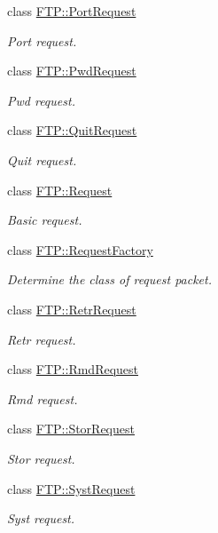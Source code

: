 \begin{DoxyCompactItemize}
class \hyperlink{classFTP_1_1PortRequest}{F\-T\-P\-::\-Port\-Request}
\begin{DoxyCompactList}\small\item\em Port request. \end{DoxyCompactList}\item 
class \hyperlink{classFTP_1_1PwdRequest}{F\-T\-P\-::\-Pwd\-Request}
\begin{DoxyCompactList}\small\item\em Pwd request. \end{DoxyCompactList}\item 
class \hyperlink{classFTP_1_1QuitRequest}{F\-T\-P\-::\-Quit\-Request}
\begin{DoxyCompactList}\small\item\em Quit request. \end{DoxyCompactList}\item 
class \hyperlink{classFTP_1_1Request}{F\-T\-P\-::\-Request}
\begin{DoxyCompactList}\small\item\em Basic request. \end{DoxyCompactList}\item 
class \hyperlink{classFTP_1_1RequestFactory}{F\-T\-P\-::\-Request\-Factory}
\begin{DoxyCompactList}\small\item\em Determine the class of request packet. \end{DoxyCompactList}\item 
class \hyperlink{classFTP_1_1RetrRequest}{F\-T\-P\-::\-Retr\-Request}
\begin{DoxyCompactList}\small\item\em Retr request. \end{DoxyCompactList}\item 
class \hyperlink{classFTP_1_1RmdRequest}{F\-T\-P\-::\-Rmd\-Request}
\begin{DoxyCompactList}\small\item\em Rmd request. \end{DoxyCompactList}\item 
class \hyperlink{classFTP_1_1StorRequest}{F\-T\-P\-::\-Stor\-Request}
\begin{DoxyCompactList}\small\item\em Stor request. \end{DoxyCompactList}\item 
class \hyperlink{classFTP_1_1SystRequest}{F\-T\-P\-::\-Syst\-Request}
\begin{DoxyCompactList}\small\item\em Syst request. \end{DoxyCompactList}\item 

\end{DoxyCompactItemize}
